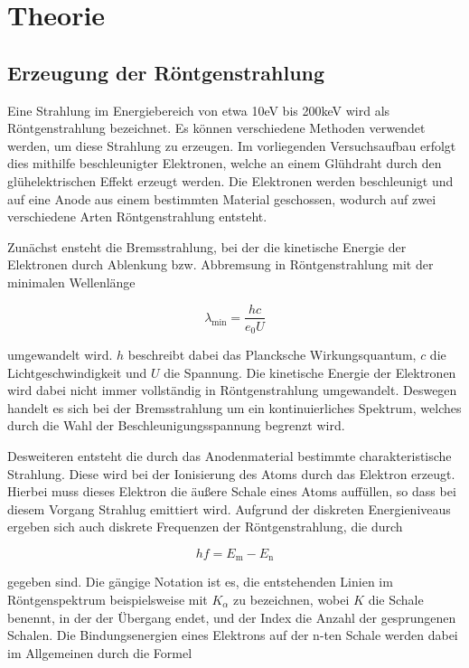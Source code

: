 \section{Theorie}
\label{sec:Theorie}

\subsection{Erzeugung der Röntgenstrahlung}

Eine Strahlung im Energiebereich von etwa 10eV bis 200keV wird als Röntgenstrahlung
bezeichnet. Es können verschiedene Methoden verwendet werden, um diese Strahlung 
zu erzeugen. 
Im vorliegenden Versuchsaufbau erfolgt dies mithilfe beschleunigter
Elektronen, welche an einem Glühdraht durch den glühelektrischen Effekt erzeugt
werden. Die Elektronen werden beschleunigt und auf eine Anode aus einem bestimmten 
Material geschossen, wodurch auf zwei verschiedene Arten Röntgenstrahlung entsteht.

Zunächst ensteht die Bremsstrahlung, bei der die kinetische Energie der Elektronen
durch Ablenkung bzw. Abbremsung in Röntgenstrahlung mit der minimalen Wellenlänge 

\begin{equation}
\lambda_\text{min} = \frac{h c}{e_0 U}
\label{eqn:lambda}
\end{equation}

umgewandelt wird. $h$ beschreibt dabei das Plancksche Wirkungsquantum, $c$ die Lichtgeschwindigkeit
und $U$ die Spannung.
Die kinetische Energie der Elektronen wird dabei nicht immer vollständig in 
Röntgenstrahlung umgewandelt. Deswegen handelt es sich bei der Bremsstrahlung
um ein kontinuierliches Spektrum, welches durch die Wahl der Beschleunigungsspannung
begrenzt wird.

Desweiteren entsteht die durch das Anodenmaterial bestimmte charakteristische 
Strahlung. Diese wird bei der Ionisierung des Atoms durch das Elektron erzeugt. 
Hierbei muss dieses Elektron die äußere Schale eines Atoms auffüllen, so dass bei 
diesem Vorgang Strahlug emittiert wird. 
Aufgrund der diskreten Energieniveaus ergeben sich auch diskrete Frequenzen der
Röntgenstrahlung, die durch 

\begin{equation}
h f = E_\text{m} - E_\text{n}
\end{equation}

gegeben sind. 
Die gängige Notation ist es, die entstehenden Linien im Röntgenspektrum 
beispielsweise mit $K_\alpha$ zu bezeichnen, wobei $K$ die Schale benennt,
in der der Übergang endet, und der Index die Anzahl der gesprungenen Schalen. 
Die Bindungsenergien eines Elektrons auf der n-ten Schale werden dabei im 
Allgemeinen durch die Formel 

